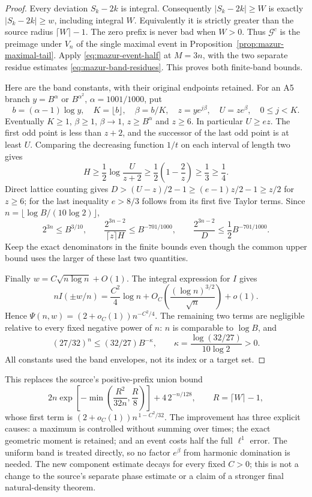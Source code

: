 \documentclass[11pt]{article}
\theoremstyle{remark}\newtheorem{remark}[proposition]{Remark}
\begin{document}
\begin{proof}
Every deviation $S_k-2k$ is integral. Consequently
$|S_k-2k|\ge W$ is exactly $|S_k-2k|\ge w$, including integral $W$.
Equivalently it is strictly greater than the source radius
$\lceil W\rceil-1$. The zero prefix is never bad when $W>0$.
Thus $\mathcal G^c$ is the preimage under $V_n$ of the single
maximal event in Proposition~\ref{prop:mazur-maximal-tail}.
Apply \eqref{eq:mazur-event-half} at $M=3n$, with the two separate
residue estimates \eqref{eq:mazur-band-residues}. This proves both
finite-band bounds.

Here are the band constants, with their original endpoints retained.
For an A5 branch $y=B^\alpha$ or $B^{\alpha^2}$,
$\alpha=1001/1000$, put
\[
 b=(\alpha-1)\log y,\quad K=\lfloor b\rfloor,\quad
 \beta=b/K,\quad z=y e^{j\beta},\quad U=z e^\beta,\quad 0\le j<K.
\]
Eventually $K\ge1$, $\beta\ge1$, $\beta\to1$, $z\ge B^\alpha$
and $z\ge6$. In particular $U\ge ez$.
The first odd point is less than $z+2$, and the successor of the
last odd point is at least $U$. Comparing the decreasing function
$1/t$ on each interval of length two gives
\[
 H\ge\frac12\log\frac{U}{z+2}
 \ge\frac12\left(1-\frac2z\right)\ge\frac13\ge\frac14.
\]
Direct lattice counting gives
$D>(U-z)/2-1\ge(e-1)z/2-1\ge z/2$ for $z\ge6$;
for the last inequality $e>8/3$ follows from its first five
Taylor terms. Since $n=\lfloor\log B/(10\log2)\rfloor$,
\[
 2^{3n}\le B^{3/10},\qquad
 \frac{2^{3n-2}}{\lceil z\rceil H}\le B^{-701/1000},\qquad
 \frac{2^{3n-2}}D\le\frac12 B^{-701/1000}.
\]
Keep the exact denominators in the finite bounds even though the
common upper bound uses the larger of these last two quantities.

Finally $w=C\sqrt{n\log n}+O(1)$. The integral expression for $I$ gives
\[
 nI(\pm w/n)=\frac{C^2}{4}\log n
   +O_C\!\left(\frac{(\log n)^{3/2}}{\sqrt n}\right)+o(1).
\]
Hence $\Psi(n,w)=(2+o_C(1))n^{-C^2/4}$.
The remaining two terms are negligible relative to every fixed
negative power of $n$: $n$ is comparable to $\log B$, and
\[
 (27/32)^n\le(32/27)B^{-\kappa},\qquad
 \kappa=\frac{\log(32/27)}{10\log2}>0.
\]
All constants used the band envelopes, not its index or a target set.
\end{proof}

This replaces the source's positive-prefix union bound
\[
 2n\exp\left[-\min\left(\frac{R^2}{32n},\frac R8\right)\right]
       +4\,2^{-n/128},\qquad R=\lceil W\rceil-1,
\]
whose first term is $(2+o_C(1))n^{\,1-C^2/32}$.
The improvement has three explicit causes: a maximum is controlled
without summing over times; the exact geometric moment is retained;
and an event costs half the full $\ell^1$ error.
The uniform band is treated directly, so no factor $e^\beta$ from
harmonic domination is needed. The new component estimate decays
for every fixed $C>0$; this is not a change to the source's separate
phase estimate or a claim of a stronger final natural-density theorem.
\end{document}
